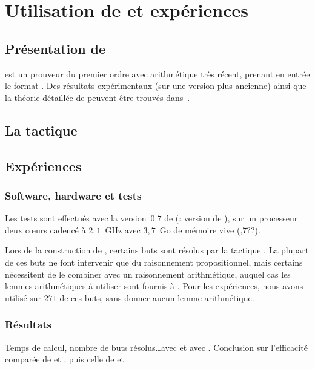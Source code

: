 \section{Utilisation de \beagle et expériences}
\label{sec:experiences}

\subsection{Présentation de \beagle}
\beagle est un prouveur du premier ordre avec arithmétique très récent,
prenant en entrée le format \tff. Des résultats expérimentaux (sur une
version plus ancienne) ainsi que la théorie détaillée de \beagle peuvent être
trouvés dans~\cite{DBLP:conf/cade/BaumgartnerW13}.


\subsection{La tactique \beagletac}
\label{sec:experiences:beagletac}

\todo


\subsection{Expériences}
\label{sec:experiences:experiences}

\subsubsection{Software, hardware et tests}
Les tests sont effectués avec la version~$0.7$ de \beagle (\todo:
version de \holfour), sur un processeur deux cœurs cadencé à $2,1$~GHz
avec $3,7$~Go de mémoire vive (,7??).

Lors de la construction de \holfour, certains buts sont résolus par la
tactique \metistac. La plupart de ces buts ne font intervenir que du
raisonnement propositionnel, mais certains nécessitent de le combiner
avec un raisonnement arithmétique, auquel cas les lemmes arithmétiques à
utiliser sont fournis à \metistac. Pour les expériences, nous avons
utilisé \beagletac sur $271$ de ces buts, sans donner aucun lemme
arithmétique.


\subsubsection{Résultats}

\todo Temps de calcul, nombre de buts résolus\dots avec \metistac et
avec \beagletac. Conclusion sur l'efficacité comparée de \beagletac et
\metistac, puis celle de \beagle et \metis.


